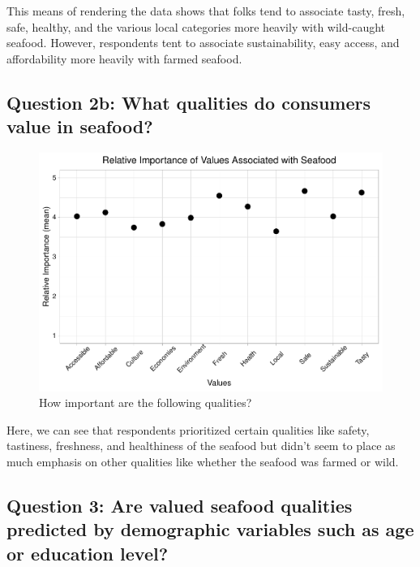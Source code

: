 \documentclass[
  12pt,
]{article}
\begin{document}
This means of rendering the data shows that folks tend to associate
tasty, fresh, safe, healthy, and the various local categories more
heavily with wild-caught seafood. However, respondents tent to associate
sustainability, easy access, and affordability more heavily with farmed
seafood.

\hypertarget{question-2b-what-qualities-do-consumers-value-in-seafood}{%
\subsection{Question 2b: What qualities do consumers value in
seafood?}\label{question-2b-what-qualities-do-consumers-value-in-seafood}}

\begin{figure}
\centering
\includegraphics{Final_rmd_files/figure-latex/importance-1.pdf}
\caption{How important are the following qualities?}
\end{figure}

Here, we can see that respondents prioritized certain qualities like
safety, tastiness, freshness, and healthiness of the seafood but didn't
seem to place as much emphasis on other qualities like whether the
seafood was farmed or wild.

\hypertarget{question-3-are-valued-seafood-qualities-predicted-by-demographic-variables-such-as-age-or-education-level}{%
\subsection{Question 3: Are valued seafood qualities predicted by
demographic variables such as age or education
level?}\label{question-3-are-valued-seafood-qualities-predicted-by-demographic-variables-such-as-age-or-education-level}}
\end{document}
